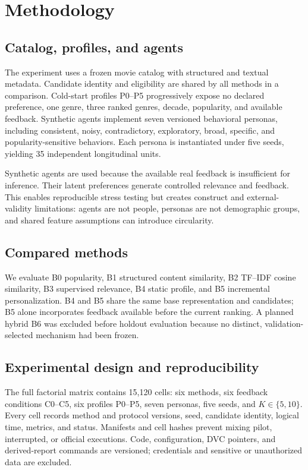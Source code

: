 \documentclass[sigconf,anonymous,review,natbib=false]{acmart}
\begin{document}
\section{Methodology}

\subsection{Catalog, profiles, and agents}

The experiment uses a frozen movie catalog with structured and textual
metadata. Candidate identity and eligibility are shared by all methods in a
comparison. Cold-start profiles P0--P5 progressively expose no declared
preference, one genre, three ranked genres, decade, popularity, and available
feedback. Synthetic agents implement seven versioned behavioral personas,
including consistent, noisy, contradictory, exploratory, broad, specific, and
popularity-sensitive behaviors. Each persona is instantiated under five seeds,
yielding 35 independent longitudinal units.

Synthetic agents are used because the available real feedback is insufficient
for inference. Their latent preferences generate controlled relevance and
feedback. This enables reproducible stress testing but creates construct and
external-validity limitations: agents are not people, personas are not
demographic groups, and shared feature assumptions can introduce circularity.

\subsection{Compared methods}

We evaluate B0 popularity, B1 structured content similarity, B2 TF--IDF
cosine similarity, B3 supervised relevance, B4 static profile, and B5
incremental personalization. B4 and B5 share the same base representation and candidates;
B5 alone incorporates feedback available before the current ranking. A planned
hybrid B6 was excluded before holdout evaluation because no distinct,
validation-selected mechanism had been frozen.

\subsection{Experimental design and reproducibility}

The full factorial matrix contains 15,120 cells: six methods, six feedback
conditions C0--C5, six profiles P0--P5, seven personas, five seeds, and
$K\in\{5,10\}$. Every cell records method and protocol versions, seed, candidate
identity, logical time, metrics, and status. Manifests and cell hashes prevent
mixing pilot, interrupted, or official executions. Code, configuration, DVC
pointers, and derived-report commands are versioned; credentials and sensitive
or unauthorized data are excluded.
\end{document}
